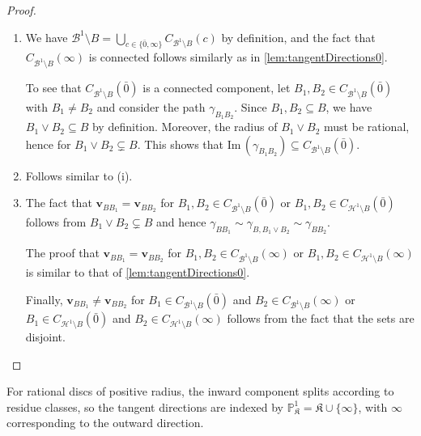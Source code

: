 \documentclass[10pt]{article}
\theoremstyle{definition}
\renewcommand{\Im}{\mathrm{Im} \,}
\renewcommand{\vec}[1]{\mathbf{#1}}
\begin{document}
\begin{proof}\
  \begin{enumerate}
  \item[(i)] We have $\mathcal B^1\setminus B = \bigcup_{c\in\{\bar 0,\infty\}} C_{\mathcal B^1\setminus B}(c)$ by definition, and the fact that $C_{\mathcal B^1\setminus B}(\infty)$ is connected follows similarly as in \cref{lem:tangentDirections0}.

    To see that $C_{\mathcal B^1\setminus B}(\bar 0)$ is a connected component, let $B_1, B_2 \in C_{\mathcal B^1\setminus B}(\bar 0)$ with $B_1\neq B_2$ and consider the path $\gamma_{B_1B_2}$. Since $B_1,B_2\subseteq B$, we have $B_1\vee B_2\subseteq B$ by definition.  Moreover, the radius of $B_1\vee B_2$ must be rational, hence for $B_1\vee B_2\subsetneq B$. This shows that $\Im(\gamma_{B_1B_2})\subseteq C_{\mathcal B^1\setminus B}(\bar 0)$.
  \item[(ii)] Follows similar to (i).
  \item[(iii)] The fact that $\vec{v}_{B B_1}= \vec{v}_{B B_2}$ for $B_1, B_2\in C_{\mathcal B^1\setminus B}(\bar 0)$ or $B_1, B_2\in C_{\mathcal H^1\setminus B}(\bar 0)$ follows from $B_1\vee B_2\subsetneq B$ and hence $\gamma_{B B_1}\sim \gamma_{B,B_1\vee B_2} \sim \gamma_{B B_2}$.
  
  The proof that $\vec{v}_{B B_1}= \vec{v}_{B B_2}$ for $B_1, B_2\in C_{\mathcal B^1\setminus B}(\infty)$ or $B_1, B_2\in C_{\mathcal H^1\setminus B}(\infty)$ is similar to that of \cref{lem:tangentDirections0}.

    Finally, $\vec{v}_{B B_1}\neq \vec{v}_{B B_2}$ for $B_1\in C_{\mathcal B^1\setminus B}(\bar 0)$ and $B_2\in C_{\mathcal B^1\setminus B}(\infty)$ or $B_1\in C_{\mathcal H^1\setminus B}(\bar 0)$ and $B_2\in C_{\mathcal H^1\setminus B}(\infty)$ follows from the fact that the sets are disjoint. \qedhere
  \end{enumerate}
\end{proof}

For rational discs of positive radius, the inward component splits according to residue classes, so the tangent directions are indexed by $\mathbb P^1_{\mathfrak K}=\mathfrak K\cup\{\infty\}$, with $\infty$ corresponding to the outward direction.
\end{document}
